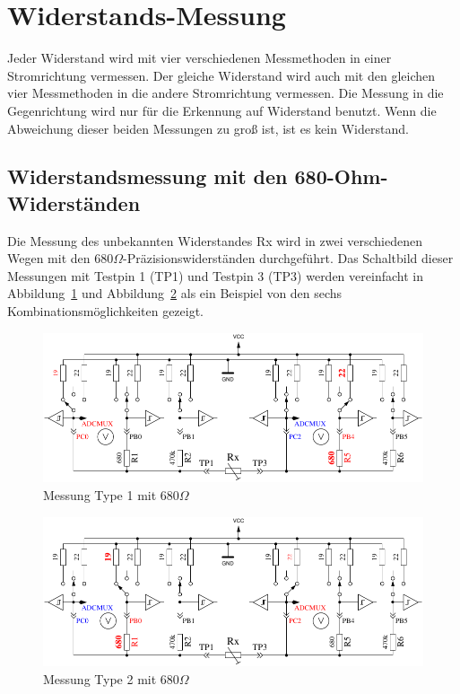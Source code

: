 \section{Widerstands-Messung}
Jeder Widerstand wird mit vier verschiedenen Messmethoden in einer Stromrichtung vermessen.
Der gleiche Widerstand wird auch mit den gleichen vier Messmethoden in die andere Stromrichtung vermessen.
Die Messung in die Gegenrichtung wird nur für die Erkennung auf Widerstand benutzt.
Wenn die Abweichung dieser beiden Messungen zu groß ist, ist es kein Widerstand.

\subsection{Widerstandsmessung mit den 680-Ohm-Widerständen}
Die Messung des unbekannten Widerstandes Rx wird in zwei verschiedenen Wegen mit den \(680\Omega\)-Präzisionswiderständen
 durchgeführt.
Das Schaltbild dieser Messungen mit Testpin 1 (TP1) und Testpin 3 (TP3) werden vereinfacht in Abbildung~\ref{fig:RL1mes} und Abbildung~\ref{fig:RL2mes} als ein Beispiel von den sechs Kombinationsmöglichkeiten gezeigt.

\begin{figure}[H]
\centering
\includegraphics[width=.8\textwidth]{../FIG/ResistormessL1.pdf}
\caption{Messung Type 1 mit \(680\Omega\) }
\label{fig:RL1mes}
\end{figure}

\begin{figure}[H]
 \centering
 \includegraphics[width=.8\textwidth]{../FIG/ResistormessL2.pdf}
 \caption{Messung Type 2 mit \(680\Omega\) }
\label{fig:RL2mes}
\end{figure}

